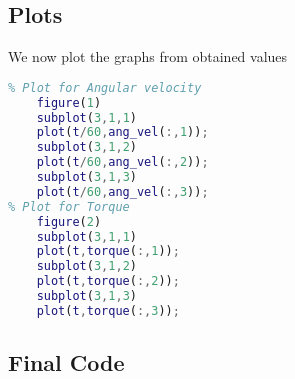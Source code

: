 \documentclass[11pt]{article}
\begin{document}
\subsection{Plots}
We now plot the graphs from obtained values
\begin{lstlisting}[language=MATLAB]
%% Plots
% Plot for Angular velocity
    figure(1)
    subplot(3,1,1)
    plot(t/60,ang_vel(:,1));
    subplot(3,1,2)
    plot(t/60,ang_vel(:,2));
    subplot(3,1,3)
    plot(t/60,ang_vel(:,3));
% Plot for Torque
    figure(2)
    subplot(3,1,1)
    plot(t,torque(:,1));
    subplot(3,1,2)
    plot(t,torque(:,2));
    subplot(3,1,3)
    plot(t,torque(:,3));
\end{lstlisting}
\subsection{Final Code}
\end{document}
